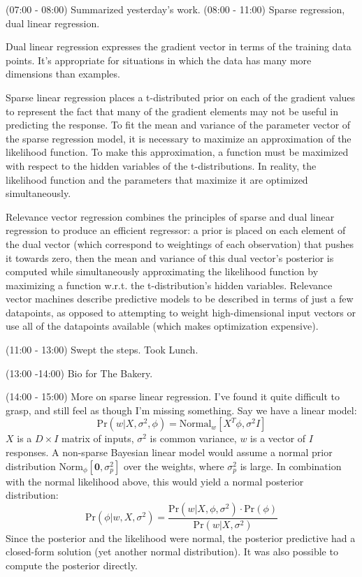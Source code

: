 \documentclass[idxtotoc,hyperref,openany]{labbook} %
\begin{document}
 (07:00 - 08:00) Summarized yesterday's work.
 (08:00 - 11:00) Sparse regression, dual linear regression. 
 
 Dual linear regression expresses the gradient vector in terms of the training data points. It's appropriate for situations in which the data has many more dimensions than examples.
 
  Sparse linear regression places a t-distributed prior on each of the gradient values to represent the fact that many of the gradient elements may not be useful in predicting the response. To fit the mean and variance of the parameter vector of the sparse regression model, it is necessary to maximize an approximation of the likelihood function. To make this approximation, a function must be maximized with respect to the hidden variables of the t-distributions. In reality, the likelihood function and the parameters that maximize it are optimized simultaneously.
 
  Relevance vector regression combines the principles of sparse and dual linear regression to produce an efficient regressor: a prior is placed on each element of the dual vector (which correspond to weightings of each observation) that pushes it towards zero, then the mean and variance of this dual vector's posterior is computed while simultaneously approximating the likelihood function by maximizing a function w.r.t. the t-distribution's hidden variables. Relevance vector machines describe predictive models to be described in terms of just a few datapoints, as opposed to attempting to weight high-dimensional input vectors or use all of the datapoints available (which makes optimization expensive).

(11:00 - 13:00) Swept the steps. Took Lunch.

(13:00 -14:00) Bio for The Bakery.

(14:00 - 15:00) More on sparse linear regression. I've found it quite difficult to grasp, and still feel as though I'm missing something. Say we have a linear model:
\[
	\text{Pr}(w|X, \sigma^2, \phi) = \text{Normal}_{w}[X^T\phi, \sigma^2 I]
\]
$X$ is a $D \times I$ matrix of inputs, $\sigma^2$ is common variance, $w$ is a vector of $I$ responses. A non-sparse Bayesian linear model would assume a normal prior distribution $\text{Norm}_\phi[\mathbf{0}, \sigma_p^2]$ over the weights, where $\sigma_p^2$ is large. In combination with the normal likelihood above, this would yield a normal posterior distribution:
\[
	\text{Pr}(\phi|w, X, \sigma^2) = \frac{\text{Pr}(w|X, \phi, \sigma^2)\cdot\text{Pr}(\phi)}{\text{Pr}(w|X, \sigma^2)}
\]
Since the posterior and the likelihood were normal, the posterior predictive had a closed-form solution (yet another normal distribution). It was also possible to compute the posterior directly.
\end{document}
